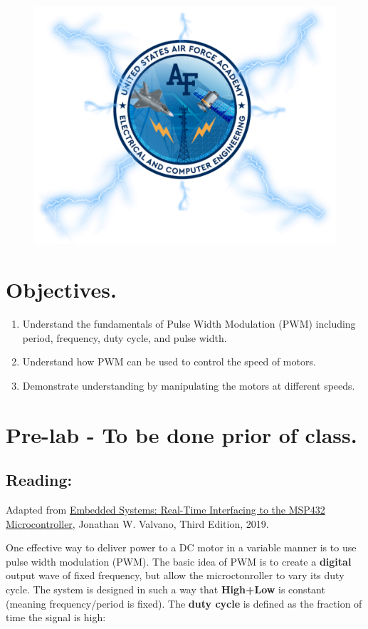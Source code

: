 \documentclass{handout}
\begin{document}
	\maketitle
	\begin{figure}[H]
		\centering
		\includegraphics[width=.75\textwidth]{Cover.PNG}
	\end{figure}
	
	\section{Objectives.} 
	\begin{enumerate}
		\item Understand the fundamentals of Pulse Width Modulation (PWM) including period, frequency, duty cycle, and pulse width.
		\item Understand how PWM can be used to control the speed of motors.
		\item Demonstrate understanding by manipulating the motors at different speeds.
	\end{enumerate}
	
	\section{Pre-lab - To be done prior of class.}
	\subsection{Reading:}
	Adapted from \underline{Embedded Systems: Real-Time Interfacing to the MSP432 Microcontroller}, Jonathan W. Valvano, Third Edition, 2019.
		
	One effective way to deliver power to a DC motor in a variable manner is to use pulse width modulation (PWM). The basic idea of PWM is to create a \textbf{digital} output wave of fixed frequency, but allow the microctonroller to vary its duty cycle. The system is designed in such a way that \textbf{High+Low} is constant (meaning frequency/period is fixed). The \textbf{duty cycle} is defined as the fraction of time the signal is high:
	
\end{document}
